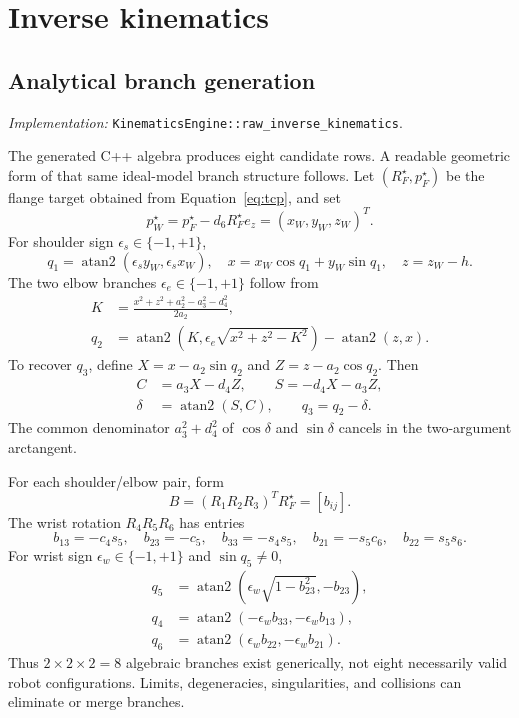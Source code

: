\documentclass[11pt,a4paper]{report}
\newcommand{\file}[1]{\nolinkurl{#1}}
\newcommand{\src}[1]{\textit{Implementation:} \file{#1}.}
\newcommand{\atan}{\operatorname{atan2}}
\begin{document}
\section{Inverse kinematics}
\subsection{Analytical branch generation}
\src{KinematicsEngine::raw_inverse_kinematics}

The generated C++ algebra produces eight candidate rows. A readable geometric
form of that same ideal-model branch structure follows. Let $(R_F^\star,p_F^\star)$
be the flange target obtained from Equation~\eqref{eq:tcp}, and set
\begin{equation}
 p_W^\star=p_F^\star-d_6R_F^\star e_z=(x_W,y_W,z_W)^T.
\end{equation}
For shoulder sign $\epsilon_s\in\{-1,+1\}$,
\begin{equation}
 q_1=\atan(\epsilon_s y_W,\epsilon_s x_W),\quad
 x=x_W\cos q_1+y_W\sin q_1,\quad z=z_W-h.
\end{equation}
The two elbow branches $\epsilon_e\in\{-1,+1\}$ follow from
\begin{align}
 K&=\frac{x^2+z^2+a_2^2-a_3^2-d_4^2}{2a_2},\\
 q_2&=\atan\!\left(K,\epsilon_e\sqrt{x^2+z^2-K^2}\right)-\atan(z,x).
 \label{eq:elbow}
\end{align}
To recover $q_3$, define $X=x-a_2\sin q_2$ and $Z=z-a_2\cos q_2$. Then
\begin{align}
 C&=a_3X-d_4Z,\qquad S=-d_4X-a_3Z,\\
 \delta&=\atan(S,C),\qquad q_3=q_2-\delta.
\end{align}
The common denominator $a_3^2+d_4^2$ of $\cos\delta$ and $\sin\delta$
cancels in the two-argument arctangent.

For each shoulder/elbow pair, form
\begin{equation}
 B=(R_1R_2R_3)^TR_F^\star=[b_{ij}].
\end{equation}
The wrist rotation $R_4R_5R_6$ has entries
\begin{equation}
 b_{13}=-c_4s_5,\quad b_{23}=-c_5,\quad b_{33}=-s_4s_5,
 \quad b_{21}=-s_5c_6,\quad b_{22}=s_5s_6.
\end{equation}
For wrist sign $\epsilon_w\in\{-1,+1\}$ and $\sin q_5\ne0$,
\begin{align}
 q_5&=\atan\!\left(\epsilon_w\sqrt{1-b_{23}^2},-b_{23}\right),\\
 q_4&=\atan(-\epsilon_w b_{33},-\epsilon_w b_{13}),\\
 q_6&=\atan(\epsilon_w b_{22},-\epsilon_w b_{21}).
 \label{eq:wrist}
\end{align}
Thus $2\times2\times2=8$ algebraic branches exist generically, not eight
necessarily valid robot configurations. Limits, degeneracies, singularities,
and collisions can eliminate or merge branches.
\end{document}
